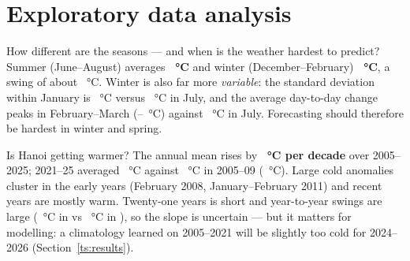 \section{Exploratory data analysis}\label{ts:eda}
\begin{finding}
\Q How different are the seasons — and when is the weather hardest to predict?
\F Summer (June–August) averages \textbf{\TSSummer~°C} and winter (December–February) \textbf{\TSWinter~°C}, a swing of about
\TSSeasonGap~°C. Winter is also far more \emph{variable}: the standard deviation within January is \TSJanStd~°C versus
\TSJulStd~°C in July, and the average day-to-day change peaks in February–March (\TSDtdFeb–\TSDtdMar~°C) against \TSDtdJul~°C
in July. Forecasting should therefore be hardest in winter and spring.
\end{finding}

\begin{finding}
\Q Is Hanoi getting warmer?
\F The annual mean rises by \textbf{\TSTrend~°C per decade} over 2005–2025; 2021–25 averaged \TSLastFive~°C against
\TSFirstFive~°C in 2005–09 (\TSDeltaFive~°C). Large cold anomalies cluster in the early years (February 2008, January–February
2011) and recent years are mostly warm. Twenty-one years is short and year-to-year swings are large (\TSAnnualMin~°C in
\TSAnnualMinYear{} vs \TSAnnualMax~°C in \TSAnnualMaxYear), so the slope is uncertain — but it matters for modelling: a
climatology learned on 2005–2021 will be slightly too cold for 2024–2026 (Section~\ref{ts:results}).
\end{finding}

